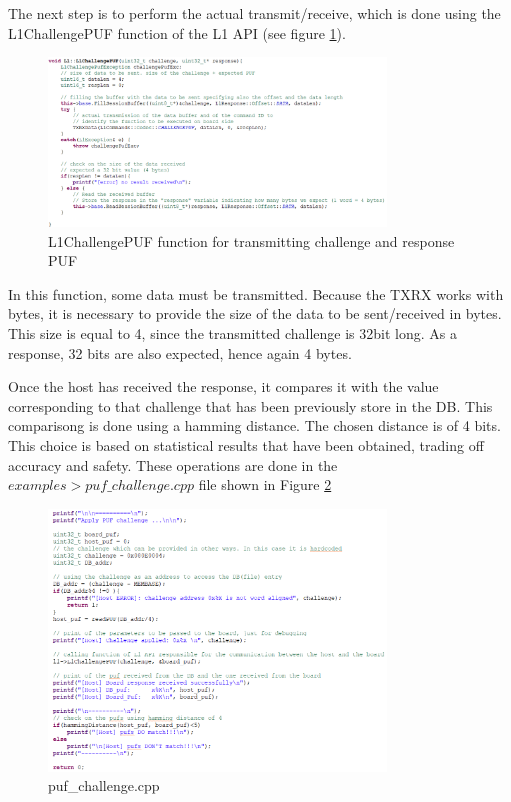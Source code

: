The next step is to perform the actual transmit/receive, which is done using the L1ChallengePUF function of the L1 API (see figure \ref{fig:L1ChallengePUF}).

\begin{figure}[h!]
	\vspace{0.5cm}
	\includegraphics[width = 0.8\textwidth]{images/L1ChallengePUF.png}
	\caption{L1ChallengePUF function for transmitting challenge and response PUF}
	\label{fig:L1ChallengePUF}
\end{figure}


In this function, some data must be transmitted. Because the TXRX works with bytes, it is necessary to provide the size of the data to be sent/received in bytes. This size is equal to 4, since the transmitted challenge is 32bit long. As a response, 32 bits are also expected, hence again 4 bytes.

Once the host has received the response, it compares it with the value corresponding to that challenge that has been previously store in the DB. This comparisong is done using a hamming distance. The chosen distance is of 4 bits. This choice is based on statistical results that have been obtained, trading off accuracy and safety. These operations are done in the $examples > puf\_challenge.cpp$ file shown in Figure \ref{fig:puf_challenge.cpp}

\begin{figure}[h!]
	\vspace{0.5cm}
	\includegraphics[width = 0.8\textwidth]{images/puf_challenge.png}
	\caption{puf\_challenge.cpp}
	\label{fig:puf_challenge.cpp}
\end{figure}

